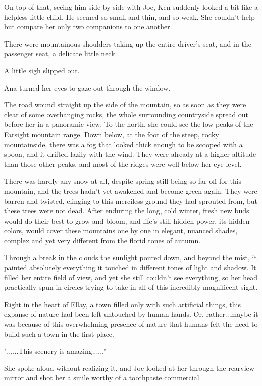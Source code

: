 \documentclass[
]{article}
\begin{document}
On top of that, seeing him side-by-side with Joe, Ken suddenly looked a
bit like a helpless little child. He seemed so small and thin, and so
weak. She couldn't help but compare her only two companions to one
another.

There were mountainous shoulders taking up the entire driver's seat, and
in the passenger seat, a delicate little neck.

A little sigh slipped out.

Ana turned her eyes to gaze out through the window.

The road wound straight up the side of the mountain, so as soon as they
were clear of some overhanging rocks, the whole surrounding countryside
spread out before her in a panoramic view. To the north, she could see
the low peaks of the Farsight mountain range. Down below, at the foot of
the steep, rocky mountainside, there was a fog that looked thick enough
to be scooped with a spoon, and it drifted lazily with the wind. They
were already at a higher altitude than those other peaks, and most of
the ridges were well below her eye level.

There was hardly any snow at all, despite spring still being so far off
for this mountain, and the trees hadn't yet awakened and become green
again. They were barren and twisted, clinging to this merciless ground
they had sprouted from, but these trees were not dead. After enduring
the long, cold winter, fresh new buds would do their best to grow and
bloom, and life's still-hidden power, its hidden colors, would cover
these mountains one by one in elegant, nuanced shades, complex and yet
very different from the florid tones of autumn.

Through a break in the clouds the sunlight poured down, and beyond the
mist, it painted absolutely everything it touched in different tones of
light and shadow. It filled her entire field of view, and yet she still
couldn't see everything, so her head practically spun in circles trying
to take in all of this incredibly magnificent sight.

Right in the heart of Ellay, a town filled only with such artificial
things, this expanse of nature had been left untouched by human hands.
Or, rather...maybe it was because of this overwhelming presence of
nature that humans felt the need to build such a town in the first
place.

"......This scenery is amazing......"

She spoke aloud without realizing it, and Joe looked at her through the
rearview mirror and shot her a smile worthy of a toothpaste commercial.
\end{document}
